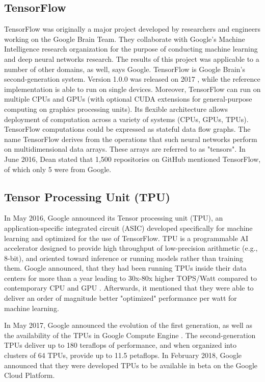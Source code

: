 \subsection{TensorFlow}
TensorFlow \cite{Link4} was originally a major project developed by researchers and engineers working on the Google Brain Team. They collaborate with Google’s Machine Intelligence research organization for the purpose of conducting machine learning and deep neural networks research. The results of this project was applicable to a number of other domains, as well, says Google.
TensorFlow is Google Brain's second-generation system. Version 1.0.0 was released on 2017 \cite{Reference30}, while the reference implementation is able to run on single devices.   Moreover, TensorFlow can run on multiple CPUs and GPUs (with optional CUDA extensions for general-purpose computing on graphics processing units). Its flexible architecture allows deployment of computation across a variety of systems (CPUs, GPUs, TPUs).
TensorFlow computations could be expressed as stateful data flow graphs. The name TensorFlow derives from the operations that such neural networks perform on multidimensional data arrays. These arrays are referred to as "tensors". In June 2016, Dean stated that 1,500 repositories on GitHub mentioned TensorFlow, of which only 5 were from Google.

\subsection{Tensor Processing Unit (TPU)}
In May 2016, Google announced its Tensor processing unit (TPU), an application-specific integrated circuit (ASIC) developed specifically for machine learning and optimized for the use of TensorFlow. TPU is a programmable AI accelerator designed to provide high throughput of low-precision arithmetic (e.g., 8-bit), and oriented toward inference or running models rather than training them. Google announced, that they had been running TPUs inside their data centers for more than a year  leading to 30x-80x higher TOPS/Watt compared to contemporary CPU and GPU \cite{Reference78}. Afterwards, it mentioned that they were able to deliver an order of magnitude better "optimized" performance per watt for machine learning.\cite{Reference31}

In May 2017, Google announced the evolution of the first generation, as well as the availability of the TPUs in Google Compute Engine \cite{Reference32}. The second-generation TPUs deliver up to 180 teraflops of performance, and when organized into clusters of 64 TPUs, provide up to 11.5 petaflops.
In February 2018, Google announced that they were developed TPUs to be available in beta on the Google Cloud Platform.



